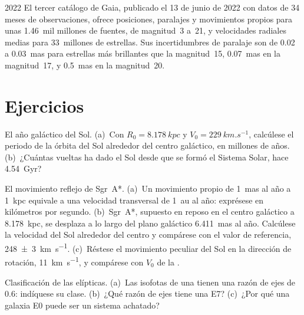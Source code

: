 \begin{dated}{2022}
El tercer catálogo de Gaia, publicado el 13 de junio de 2022 con datos de 34 meses de
observaciones, ofrece posiciones, paralajes y movimientos propios para unas
1.46~mil millones de fuentes, de magnitud~3 a~21, y velocidades radiales medias
para 33~millones de estrellas. Sus incertidumbres de paralaje son de 0.02 a
\qty{0.03}{mas} para estrellas más brillantes que la magnitud~15, \qty{0.07}{mas} en
la magnitud~17, y \qty{0.5}{mas} en la magnitud~20.
\end{dated}

\section{Ejercicios}

\begin{exercise}[$\star$]\label{exo:b3:milky-way-galaxies:1}
El año galáctico del Sol. (a)~Con $R_0 = \qty{8.178}{kpc}$ y
$V_0 = \qty{229}{km.s^{-1}}$, calcúlese el periodo de la órbita del Sol alrededor del
centro galáctico, en millones de años. (b)~¿Cuántas vueltas ha dado el Sol
desde que se formó el Sistema Solar, hace \qty{4.54}{Gyr}?
\end{exercise}

\begin{exercise}[$\star$]\label{exo:b3:milky-way-galaxies:2}
El movimiento reflejo de Sgr~A*. (a)~Un movimiento propio de \qty{1}{mas} al año
a \qty{1}{kpc} equivale a una velocidad transversal de \qty{1}{au} al año: exprésese en
kilómetros por segundo. (b)~Sgr~A*, supuesto en reposo en el centro galáctico
a \qty{8.178}{kpc}, se desplaza a lo largo del plano galáctico \qty{6.411}{mas}
al año. Calcúlese la velocidad del Sol alrededor del centro y compárese con el
valor de referencia, \qty[separate-uncertainty=true]{248 \pm 3}{km.s^{-1}}. (c)~Réstese el
movimiento peculiar del Sol en la dirección de rotación, \qty{11}{km.s^{-1}}, y
compárese con $V_0$ de la .
\end{exercise}

\begin{exercise}[$\star$]\label{exo:b3:milky-way-galaxies:3}
Clasificación de las elípticas. (a)~Las isofotas de una  tienen una
razón de ejes de 0.6: indíquese su clase. (b)~¿Qué razón de ejes tiene una E7?
(c)~¿Por qué una galaxia E0 puede ser un sistema achatado?
\end{exercise}

